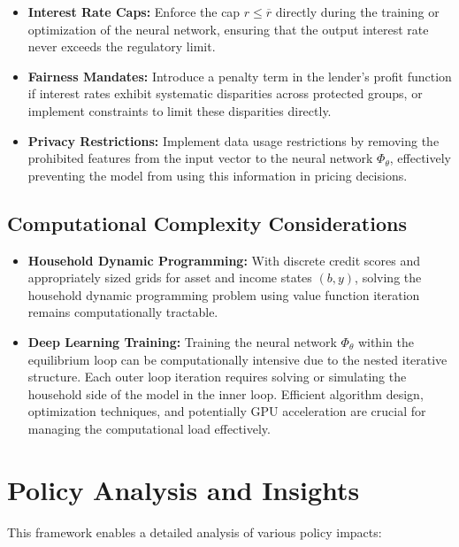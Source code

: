 \documentclass[acmsmall]{acmart}
\begin{document}
\begin{itemize}
    \item \textbf{Interest Rate Caps:} Enforce the cap $r \leq \overline{r}$ directly during the training or optimization of the neural network, ensuring that the output interest rate never exceeds the regulatory limit.
    \item \textbf{Fairness Mandates:} Introduce a penalty term in the lender's profit function if interest rates exhibit systematic disparities across protected groups, or implement constraints to limit these disparities directly.
    \item \textbf{Privacy Restrictions:}  Implement data usage restrictions by removing the prohibited features from the input vector to the neural network $\Phi_\theta$, effectively preventing the model from using this information in pricing decisions.
\end{itemize}

\subsection*{Computational Complexity Considerations}

\begin{itemize}
    \item \textbf{Household Dynamic Programming:} With discrete credit scores and appropriately sized grids for asset and income states $(b,y)$, solving the household dynamic programming problem using value function iteration remains computationally tractable.
    \item \textbf{Deep Learning Training:} Training the neural network $\Phi_\theta$ within the equilibrium loop can be computationally intensive due to the nested iterative structure. Each outer loop iteration requires solving or simulating the household side of the model in the inner loop. Efficient algorithm design, optimization techniques, and potentially GPU acceleration are crucial for managing the computational load effectively.
\end{itemize}

\section*{Policy Analysis and Insights}

This framework enables a detailed analysis of various policy impacts:
\end{document}
